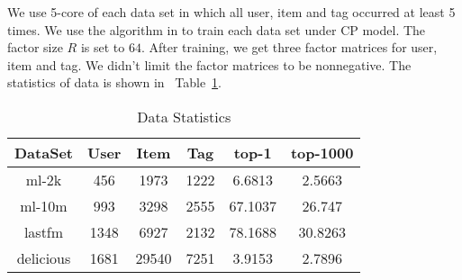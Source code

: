 \documentclass[letterpaper]{article}
\newcommand{\Table}[1] {Table~\ref{table:#1}}
\begin{document}
We use 5-core of each data set in which all user, item and tag occurred at least 5 times.
We use the algorithm in \cite{Rendle_RTF} to train each data set under CP model.
The factor size $R$ is set to $64$.
After training, we get three factor matrices for user, item and tag.
We didn't limit the factor matrices to be nonnegative.
The statistics of data is shown in ~\Table{Data}.
\begin{table}[]
  \centering
  \begin{tabular}{|c|c|c|c|c|c|}
    \hline
    DataSet     & User & Item    & Tag    & top-1   & top-1000\\
    \hline
    ml-2k       & 456  &  1973   &  1222  & 6.6813  & 2.5663 \\
    ml-10m      & 993  &  3298   &  2555  & 67.1037 & 26.747 \\
    lastfm      & 1348 &  6927   &  2132  & 78.1688 & 30.8263\\
    delicious   & 1681 &  29540  &  7251  & 3.9153  & 2.7896 \\
    \hline
  \end{tabular}
  \caption{Data Statistics}
  \label{table:Data}
\end{table}
\end{document}
